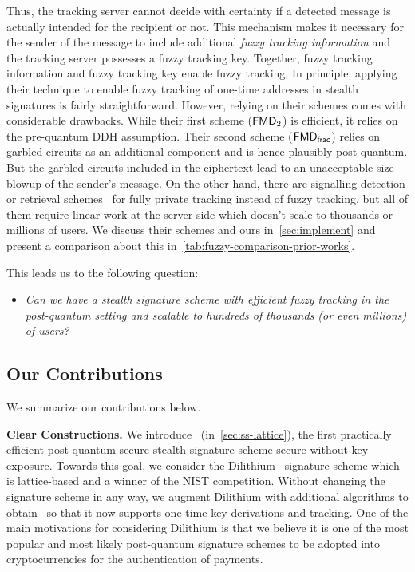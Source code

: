 Thus, the tracking server cannot decide with certainty if a detected message is actually intended for the recipient or not.
This mechanism makes it necessary for the sender of the message to include additional \emph{fuzzy tracking information} and the tracking server possesses a fuzzy tracking key. Together, fuzzy tracking information and fuzzy tracking key enable fuzzy tracking.
 In principle, applying their technique to enable fuzzy tracking of one-time addresses in stealth signatures is fairly straightforward. However, relying on their schemes comes with considerable drawbacks. While their first scheme ($\mathsf{FMD}_2$) is efficient, it relies on the pre-quantum DDH assumption. Their second scheme ($\mathsf{FMD}_{\mathsf{frac}}$) relies on garbled circuits as an additional component and is hence plausibly post-quantum. But the garbled circuits included in the ciphertext lead to an unacceptable size blowup of the sender's message. On the other hand, there are signalling detection or retrieval schemes~\cite{USENIX:MSSSV22, C:LiuTro22} for fully private tracking instead of fuzzy tracking, but all of them require linear work at the server side which doesn't scale to thousands or millions of users. We discuss their schemes and ours in~\cref{sec:implement} and present a comparison about this in~\cref{tab:fuzzy-comparison-prior-works}.

This leads us to the following question:
\begin{itemize}[leftmargin=*]
    \item \emph{Can we have a stealth signature scheme with efficient fuzzy tracking in the post-quantum setting and scalable to hundreds of thousands (or even millions) of users?}
\end{itemize}

\subsection{Our Contributions}
We summarize our contributions below.

\smallskip\noindent\textbf{Clear Constructions.} We introduce \name\ (in~\cref{sec:ss-lattice}), the first practically efficient post-quantum secure stealth signature scheme secure without key exposure.
Towards this goal, we consider the Dilithium~\cite{NISTPQC-R3:CRYSTALS-DILITHIUM20} signature scheme which is lattice-based and a winner of the NIST competition. Without changing the signature scheme in any way, we augment Dilithium with additional algorithms to obtain \name\ so that it now supports one-time key derivations and tracking. One of the main motivations for considering Dilithium is that we believe it is one of the most popular and most likely post-quantum signature schemes to be adopted into cryptocurrencies for the authentication of payments. 

